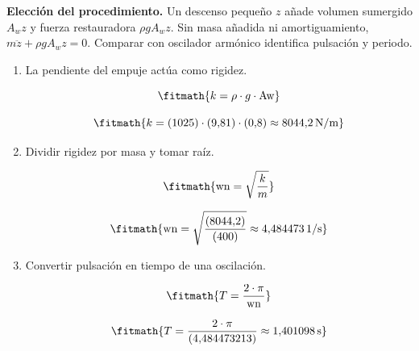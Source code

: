 \noindent\textbf{Elección del procedimiento.} Un descenso pequeño $z$ añade volumen sumergido $A_wz$ y fuerza restauradora $\rho gA_wz$. Sin masa añadida ni amortiguamiento, $m\ddot z+\rho gA_wz=0$. Comparar con oscilador armónico identifica pulsación y periodo.

\begin{enumerate}

\item La pendiente del empuje actúa como rigidez.

\[\fitmath{k=\rho\cdot g\cdot \mathrm{Aw}}\]

\[\fitmath{k=(1025)\cdot (9{,}81)\cdot (0{,}8)\approx 8044{,}2\,\mathrm{N/m}}\]

\item Dividir rigidez por masa y tomar raíz.

\[\fitmath{\mathrm{wn}=\sqrt{\frac{k}{m}}}\]

\[\fitmath{\mathrm{wn}=\sqrt{\frac{(8044{,}2)}{(400)}}\approx 4{,}484473\,\mathrm{1/s}}\]

\item Convertir pulsación en tiempo de una oscilación.

\[\fitmath{T=\frac{2\cdot \pi}{\mathrm{wn}}}\]

\[\fitmath{T=\frac{2\cdot \pi}{(4{,}484473213)}\approx 1{,}401098\,\mathrm{s}}\]

\end{enumerate}
